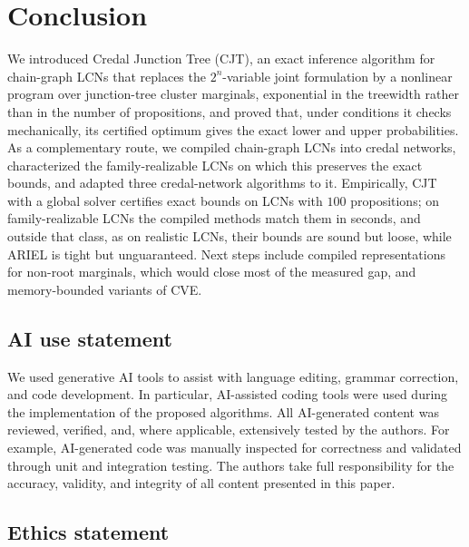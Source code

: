 \documentclass{article} %
\DeclareRobustCommand{\rev}[1]{{\color{blue}#1}}
\begin{document}
\section{Conclusion}
\label{sec-conclusion}

\rev{We introduced Credal Junction Tree (CJT), an exact inference algorithm for chain-graph LCNs that replaces the $2^n$-variable joint formulation by a nonlinear program over junction-tree cluster marginals, exponential in the treewidth rather than in the number of propositions, and proved that, under conditions it checks mechanically, its certified optimum gives the exact lower and upper probabilities. As a complementary route, we compiled chain-graph LCNs into credal networks, characterized the family-realizable LCNs on which this preserves the exact bounds, and adapted three credal-network algorithms to it. Empirically, CJT with a global solver certifies exact bounds on LCNs with $100$ propositions; on family-realizable LCNs the compiled methods match them in seconds, and outside that class, as on realistic LCNs, their bounds are sound but loose, while ARIEL is tight but unguaranteed. Next steps include compiled representations for non-root marginals, which would close most of the measured gap, and memory-bounded variants of CVE.}

\label{end-of-main}
\subsection*{AI use statement}

We used generative AI tools to assist with language editing, grammar correction, and code development. In particular, AI-assisted coding tools were used during the implementation of the proposed algorithms. All AI-generated content was reviewed, verified, and, where applicable, extensively tested by the authors. For example, AI-generated code was manually inspected for correctness and validated through unit and integration testing. The authors take full responsibility for the accuracy, validity, and integrity of all content presented in this paper.


\subsection*{Ethics statement}
\end{document}
